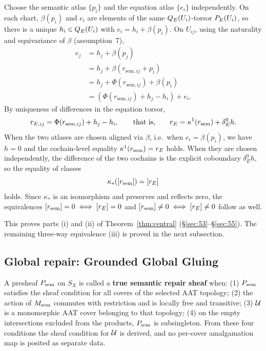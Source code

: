 Choose the semantic atlas $\{p_i\}$ and the equation atlas $\{e_i\}$
independently. On each chart, $\beta(p_i)$ and $e_i$ are elements of
the same $Q_{E}(U_i)$-torsor $P_{E}(U_i)$, so there is a unique
$h_i\in Q_{E}(U_i)$ with $e_i=h_i+\beta(p_i)$. On $U_{ij}$, using the
naturality and equivariance of $\beta$ (assumption~7),
\[
\begin{aligned}
e_j
&=h_j+\beta(p_j)\\
&=h_j+\beta(r_{\mathrm{sem},ij}+p_i)\\
&=h_j+\Phi(r_{\mathrm{sem},ij})+\beta(p_i)\\
&=(\Phi(r_{\mathrm{sem},ij})+h_j-h_i)+e_i.
\end{aligned}
\]
By uniqueness of differences in the equation torsor,
\[
r_{E,ij}=\Phi(r_{\mathrm{sem},ij})+h_j-h_i,
\qquad\text{that is,}\qquad
r_{E}=\kappa^1(r_{\mathrm{sem}})+\delta_E^0h.
\]
When the two atlases are chosen aligned via $\beta$, i.e.\ when
$e_i=\beta(p_i)$, we have $h=0$ and the cochain-level equality
$\kappa^1(r_{\mathrm{sem}})=r_{E}$ holds. When they are chosen independently, the
difference of the two cochains is the explicit coboundary
$\delta^0_Eh$, so the equality of classes
\[
\kappa_*([r_{\mathrm{sem}}])=[r_{E}]
\]
holds. Since $\kappa_*$ is an isomorphism and preserves and reflects
zero, the equivalences $[r_{\mathrm{sem}}]=0\iff[r_{E}]=0$ and
$[r_{\mathrm{sem}}]\neq0\iff[r_{E}]\neq0$ follow as well.

This proves parts (i) and (ii) of Theorem~\ref{thm:central}
(\S\ref{sec:53}--\S\ref{sec:55}). The remaining three-way equivalence
(iii) is proved in the next subsection.

\subsection{Global repair: Grounded Global Gluing}\label{sec:56}

\begin{definitionstar}
A presheaf $P_{\mathrm{sem}}$ on $S_X$ is called a \textbf{true semantic repair
sheaf} when: (1) $P_{\mathrm{sem}}$ satisfies the sheaf condition for all covers
of the selected AAT topology; (2) the action of $M_{\mathrm{sem}}$ commutes with
restriction and is locally free and transitive; (3) $\mathcal{U}$ is a
monomorphic AAT cover belonging to that topology; (4) on the empty
intersections excluded from the products, $P_{\mathrm{sem}}$ is subsingleton.
From these four conditions the sheaf condition for $\mathcal{U}$ is derived,
and no per-cover amalgamation map is posited as separate data.
\end{definitionstar}

